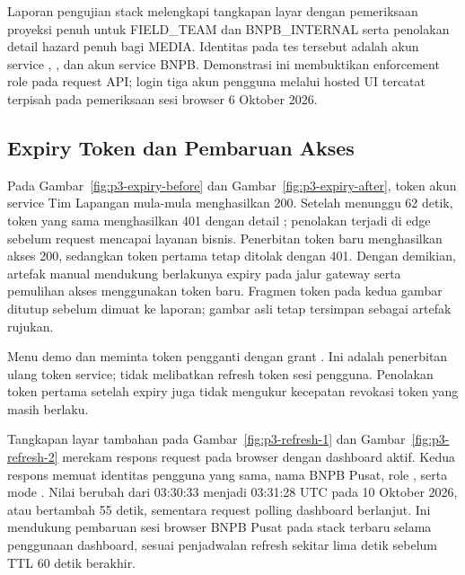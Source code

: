Laporan pengujian stack melengkapi tangkapan layar dengan pemeriksaan proyeksi penuh untuk FIELD\_TEAM dan BNPB\_INTERNAL serta penolakan detail hazard penuh bagi MEDIA. Identitas pada tes tersebut adalah akun service , , dan akun service BNPB. Demonstrasi ini membuktikan enforcement role pada request API; login tiga akun pengguna melalui hosted UI tercatat terpisah pada pemeriksaan sesi browser 6 Oktober 2026.

\subsection{Expiry Token dan Pembaruan Akses}
Pada Gambar~\ref{fig:p3-expiry-before} dan Gambar~\ref{fig:p3-expiry-after}, token akun service Tim Lapangan mula-mula menghasilkan 200. Setelah menunggu 62 detik, token yang sama menghasilkan 401 dengan detail ; penolakan terjadi di edge sebelum request mencapai layanan bisnis. Penerbitan token baru menghasilkan akses 200, sedangkan token pertama tetap ditolak dengan 401. Dengan demikian, artefak manual mendukung berlakunya expiry pada jalur gateway serta pemulihan akses menggunakan token baru. Fragmen token pada kedua gambar ditutup sebelum dimuat ke laporan; gambar asli tetap tersimpan sebagai artefak rujukan.


Menu demo dan  meminta token pengganti dengan grant . Ini adalah penerbitan ulang token service; tidak melibatkan refresh token sesi pengguna. Penolakan token pertama setelah expiry juga tidak mengukur kecepatan revokasi token yang masih berlaku.

Tangkapan layar tambahan pada Gambar~\ref{fig:p3-refresh-1} dan Gambar~\ref{fig:p3-refresh-2} merekam respons request  pada browser dengan dashboard aktif. Kedua respons memuat identitas pengguna yang sama, nama BNPB Pusat, role , serta mode . Nilai  berubah dari 03:30:33 menjadi 03:31:28 UTC pada 10 Oktober 2026, atau bertambah 55 detik, sementara request polling dashboard berlanjut. Ini mendukung pembaruan sesi browser BNPB Pusat pada stack terbaru selama penggunaan dashboard, sesuai penjadwalan refresh sekitar lima detik sebelum TTL 60 detik berakhir.

